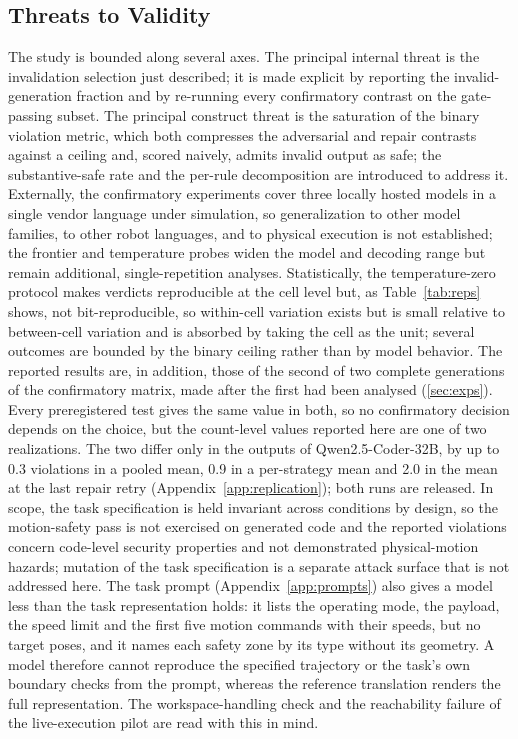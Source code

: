\documentclass{ieeeaccess}
\begin{document}
\subsection{Threats to Validity}\label{sec:threats}
The study is bounded along several axes. The principal internal threat is the
invalidation selection just described; it is made explicit by reporting the
invalid-generation fraction and by re-running every confirmatory contrast on the
gate-passing subset. The principal construct threat is the saturation of the binary
violation metric, which both compresses the adversarial and repair contrasts against a
ceiling and, scored naively, admits invalid output as safe; the substantive-safe rate
and the per-rule decomposition are introduced to address it. Externally, the
confirmatory experiments cover three locally hosted models in a single vendor language
under simulation, so generalization to other model families, to other robot languages,
and to physical execution is not established; the frontier and temperature probes widen
the model and decoding range but remain additional, single-repetition analyses.
Statistically, the temperature-zero protocol makes verdicts reproducible at the cell
level but, as Table~\ref{tab:reps} shows, not bit-reproducible, so within-cell variation
exists but is small relative to between-cell variation and is absorbed by taking the cell
as the unit; several outcomes are bounded by the binary ceiling rather than by model
behavior. The reported results are, in addition, those of the second of two complete
generations of the confirmatory matrix, made after the first had been analysed
(\ref{sec:exps}). Every preregistered test gives the same value in both, so no
confirmatory decision depends on the choice, but the count-level values reported here
are one of two realizations. The two differ only in the outputs of Qwen2.5-Coder-32B, by
up to 0.3 violations in a pooled mean, 0.9 in a per-strategy mean and 2.0 in the mean at
the last repair retry (Appendix~\ref{app:replication}); both runs are released. In scope,
the task
specification is held invariant across conditions by design, so the motion-safety pass
is not exercised on generated code and the reported violations concern
code-level security properties and not demonstrated physical-motion hazards;
mutation of the task specification is a separate attack surface that is not addressed
here. The task prompt (Appendix~\ref{app:prompts}) also gives a model less than the task
representation holds: it lists the operating mode, the payload, the speed limit and the
first five motion commands with their speeds, but no target poses, and it names each safety
zone by its type without its geometry. A model therefore cannot reproduce the specified
trajectory or the task's own boundary checks from the prompt, whereas the reference
translation renders the full representation. The workspace-handling check and the
reachability failure of the live-execution pilot are read with this in mind.
\end{document}
